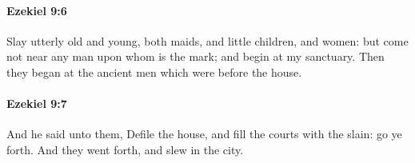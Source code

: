 		\paragraph{Ezekiel 9:6} %
			\label{EZEKIEL-9-6}

			Slay utterly old and young, both maids, and little children, and women: but come not near any man upon whom is the mark; and begin at my sanctuary. Then they began at the ancient men which were before the house.


		\paragraph{Ezekiel 9:7} %
			\label{EZEKIEL-9-7}

			And he said unto them, Defile the house, and fill the courts with the slain: go ye forth. And they went forth, and slew in the city.


